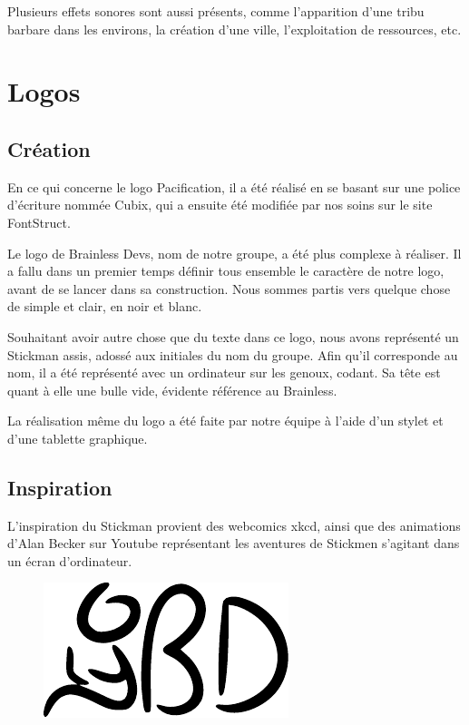 \documentclass[12pt]{report}
\begin{document}
Plusieurs effets sonores sont aussi présents, comme l’apparition d’une tribu
barbare dans les environs, la création d'une ville, l'exploitation de
ressources, etc.

\section{Logos}

\subsection{Création}

En ce qui concerne le logo Pacification, il a été réalisé en se basant sur une
police d’écriture nommée Cubix, qui a ensuite été modifiée par nos soins sur le
site FontStruct.

Le logo de Brainless Devs, nom de notre groupe, a été plus complexe à réaliser.
Il a fallu dans un premier temps définir tous ensemble le caractère de notre
logo, avant de se lancer dans sa construction. Nous sommes partis vers quelque
chose de simple et clair, en noir et blanc.

Souhaitant avoir autre chose que du texte dans ce logo, nous avons représenté un
Stickman assis, adossé aux initiales du nom du groupe. Afin qu’il corresponde au
nom, il a été représenté avec un ordinateur sur les genoux, codant. Sa tête est
quant à elle une bulle vide, évidente référence au Brainless.

La réalisation même du logo a été faite par notre équipe à l’aide d’un stylet et
d’une tablette graphique.

\newpage

\subsection{Inspiration}

L’inspiration du Stickman provient des webcomics xkcd, ainsi que des animations
d’Alan Becker sur Youtube représentant les aventures de Stickmen s’agitant dans
un écran d’ordinateur.

\vspace{1cm}

\begin{figure}[h]
    \centering
    \includegraphics{brainless_devs.pdf}
\end{figure}
\end{document}
